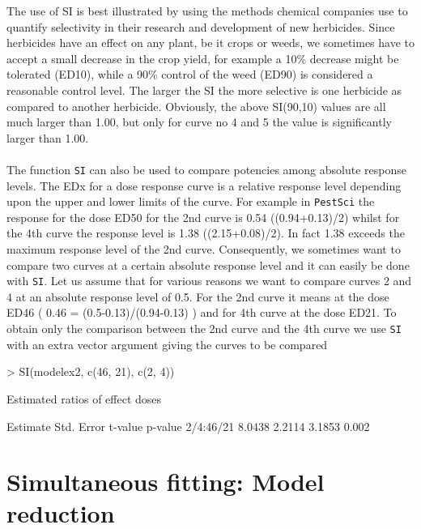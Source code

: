 \documentclass[a4paper]{article}
\begin{document}
The use of SI is best illustrated by using the methods chemical
companies use to quantify selectivity in their research and
development of new herbicides. Since herbicides have an effect on
any plant, be it crops or weeds, we sometimes have to accept a
small decrease in the crop yield, for example a 10\% decrease
might be tolerated (ED10), while a 90\% control of the weed
(ED90) is considered a reasonable control level. The larger the
SI the more selective is one herbicide as compared to another herbicide. Obviously, the above SI(90,10) values are all much
larger than 1.00, but only for curve no 4 and 5 the value is significantly larger than 1.00.
\\
\\
The function \verb+SI+ can also be used to compare potencies among absolute
response levels. The EDx for a dose response curve is a relative response level depending upon
the upper and lower limits of the curve. For example in \verb+PestSci+ the response for the dose ED50 for the 2nd curve is
0.54 ((0.94+0.13)/2) whilst for the 4th curve the response level is 1.38 ((2.15+0.08)/2). In fact 1.38
exceeds the maximum response level of the 2nd curve. Consequently, we sometimes want to compare two curves
at a certain absolute response level and it can easily be done with \verb+SI+. Let us assume that
for various reasons we want to compare curves 2 and 4 at an absolute response level of 0.5. For the 2nd curve it means at the
dose ED46 ( 0.46 = (0.5-0.13)/(0.94-0.13) ) and for 4th curve at the dose ED21.
To obtain only the comparison between the 2nd curve and the 4th curve we use \verb+SI+ with an extra vector argument giving the curves to be compared

\begin{Schunk}
\begin{Sinput}
> SI(modelex2, c(46, 21), c(2, 4))
\end{Sinput}
\begin{Soutput}
Estimated ratios of effect doses

          Estimate Std. Error t-value p-value
2/4:46/21   8.0438     2.2114  3.1853   0.002
\end{Soutput}
\end{Schunk}



\newpage
\section{Simultaneous fitting: Model reduction} \label{sec:6}
\end{document}

